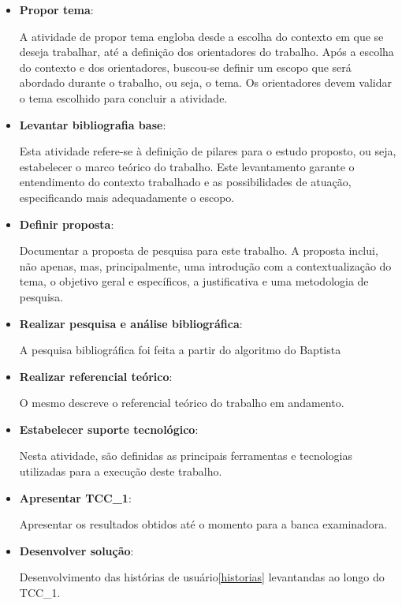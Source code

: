 \begin{itemize}
	\item \textbf{Propor tema}:

		A atividade de propor tema engloba desde a escolha do contexto em que se deseja trabalhar, até a definição dos orientadores do trabalho. Após a escolha do contexto e dos orientadores, buscou-se definir um escopo que será abordado durante o trabalho, ou seja, o tema. Os orientadores devem validar o tema escolhido para concluir a atividade.

	\item \textbf{Levantar bibliografia base}:

		Esta atividade refere-se à definição de pilares para o estudo proposto, ou seja, estabelecer o marco teórico do trabalho. Este levantamento garante o entendimento do contexto trabalhado e as possibilidades de atuação, especificando mais adequadamente o escopo.

	\item \textbf{Definir proposta}:

		Documentar a proposta de pesquisa para este trabalho. A proposta inclui, não apenas, mas, principalmente, uma introdução com a contextualização do tema, o objetivo geral e específicos, a justificativa e uma metodologia de pesquisa.

	\item \textbf{Realizar pesquisa e análise bibliográfica}:

		A pesquisa bibliográfica foi feita a partir do algoritmo do Baptista \cite{roberto}

	\item \textbf{Realizar referencial teórico}:

		O mesmo descreve o referencial teórico do trabalho em andamento.

	\item \textbf{Estabelecer suporte tecnológico}:

		Nesta atividade, são definidas as principais ferramentas e tecnologias utilizadas para a execução deste trabalho.

	\item \textbf{Apresentar TCC\_1}:

		Apresentar os resultados obtidos até o momento para a banca examinadora.

  \item \textbf{Desenvolver solução}:

    Desenvolvimento das histórias de usuário\ref{historias} levantandas ao longo do TCC\_1.


\end{itemize}
